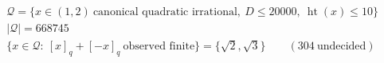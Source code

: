 \documentclass{article}
\begin{document}
\[
\begin{aligned}
&\mathcal{Q}=\{x\in(1,2)\ \text{canonical quadratic irrational},\ D\le20000,\ \operatorname{ht}(x)\le10\}\\
&|\mathcal{Q}|=668745\\
&\{x\in\mathcal{Q}:\ [x]_q+[-x]_q\ \text{observed finite}\}=\{\sqrt2,\sqrt3\}\qquad(304\ \text{undecided})
\end{aligned}
\]
\end{document}
